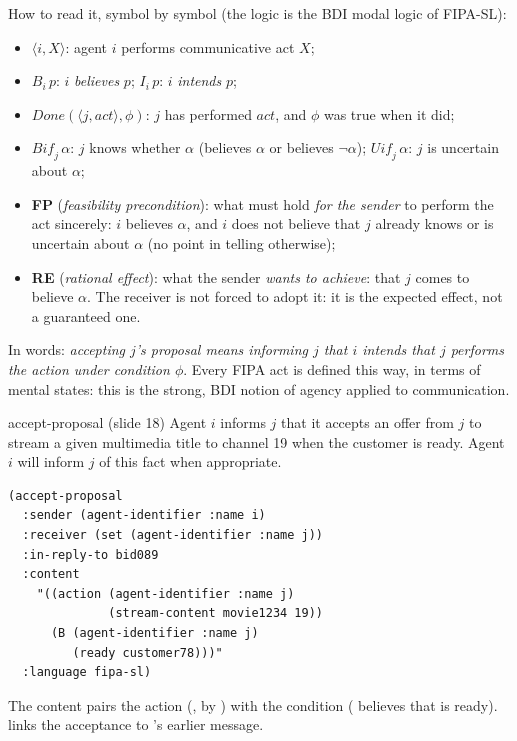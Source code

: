 How to read it, symbol by symbol (the logic is the BDI modal logic of FIPA-SL):
\begin{itemize}[nosep]
  \item $\langle i, X\rangle$: agent $i$ performs communicative act $X$;
  \item $B_i\,p$: $i$ \emph{believes} $p$; $I_i\,p$: $i$ \emph{intends} $p$;
  \item $\mathit{Done}(\langle j, act\rangle, \phi)$: $j$ has performed $act$, and $\phi$ was
        true when it did;
  \item $\mathit{Bif}_j\,\alpha$: $j$ knows whether $\alpha$ (believes $\alpha$ or believes
        $\neg\alpha$); $\mathit{Uif}_j\,\alpha$: $j$ is uncertain about $\alpha$;
  \item \textbf{FP} (\emph{feasibility precondition}): what must hold \emph{for the sender}
        to perform the act sincerely: $i$ believes $\alpha$, and $i$ does not believe that
        $j$ already knows or is uncertain about $\alpha$ (no point in telling otherwise);
  \item \textbf{RE} (\emph{rational effect}): what the sender \emph{wants to achieve}: that
        $j$ comes to believe $\alpha$. The receiver is not forced to adopt it: it is the
        expected effect, not a guaranteed one.
\end{itemize}
In words: \emph{accepting $j$'s proposal means informing $j$ that $i$ intends that $j$ performs
the action under condition $\phi$}. Every FIPA act is defined this way, in terms of mental
states: this is the strong, BDI notion of agency applied to communication.

\begin{nbexample}{accept-proposal (slide 18)}
Agent $i$ informs $j$ that it accepts an offer from $j$ to stream a given multimedia title to
channel 19 when the customer is ready. Agent $i$ will inform $j$ of this fact when
appropriate.
\begin{verbatim}
(accept-proposal
  :sender (agent-identifier :name i)
  :receiver (set (agent-identifier :name j))
  :in-reply-to bid089
  :content
    "((action (agent-identifier :name j)
              (stream-content movie1234 19))
      (B (agent-identifier :name j)
         (ready customer78)))"
  :language fipa-sl)
\end{verbatim}
The content pairs the action (, by ) with the
condition ( believes that  is ready). 
links the acceptance to 's earlier  message.
\end{nbexample}
